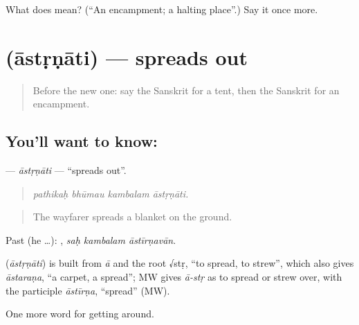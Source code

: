 \begin{tcolorbox}[breakable,colback=teal!4,colframe=teal!35!black,title={Before you move on}]
What does  mean? (\textquotedblleft{}An encampment; a halting place\textquotedblright{}.) Say it once more.
\end{tcolorbox}
\section[\texorpdfstring{\sk{आस्तृणाति} (āstṛṇāti)}{आस्तृणाति (āstṛṇāti)}]{ (āstṛṇāti) — spreads out}

\label{lesson:SA-C427-astrnati}



\begin{quote}
Before the new one: say the Sanskrit for a tent, then the Sanskrit for an encampment.
\end{quote}

\subsection*{You'll want to know: }
\textbf{} — \emph{āstṛṇāti} — \textquotedblleft{}spreads out\textquotedblright{}.

\begin{quote}
   
\end{quote}

\begin{quote}
\emph{pathikaḥ bhūmau kambalam āstṛṇāti.}
\end{quote}

\begin{quote}
The wayfarer spreads a blanket on the ground.
\end{quote}

Past (he …):   , \emph{saḥ kambalam āstīrṇavān}.

\begin{cousinweb}
\textbf{} (\emph{āstṛṇāti}) is built from \emph{ā} and the root √stṛ, \textquotedblleft{}to spread, to strew\textquotedblright{}, which also gives \emph{āstaraṇa}, \textquotedblleft{}a carpet, a spread\textquotedblright{}; MW gives \emph{ā-stṛ} as to spread or strew over, with the participle \emph{āstīrṇa}, \textquotedblleft{}spread\textquotedblright{} (MW).
\end{cousinweb}

\begin{grammarlens}[title={What you've built}]
One more word for getting around.
\end{grammarlens}

